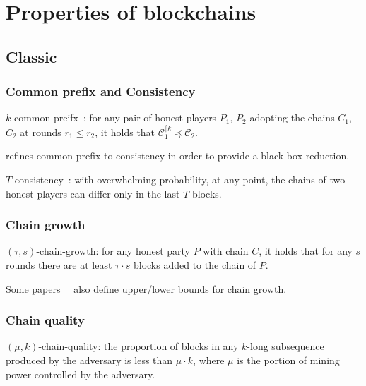 \documentclass[runningheads]{llncs}
\begin{document}
\section{Properties of blockchains}

\subsection{Classic}

\subsubsection{Common prefix and Consistency}
$k$-common-preifx~\cite{garay2015bitcoin}: for any pair of honest players $P_1$, $P_2$ adopting the chains $C_1$, $C_2$ at rounds $r_1 \leq r_2$, it holds that $\mathcal{C}_{1}^{\lceil k} \preceq \mathcal{C}_2$.

\cite{pass2017analysis} refines common prefix to consistency in order to provide a black-box reduction.

$T$-consistency~\cite{pass2017analysis}: with overwhelming probability, at any point, the chains of two honest players can differ only in the last $T$ blocks.

\subsubsection{Chain growth}
$(\tau, s)$-chain-growth: for any honest party $P$ with chain $C$, it holds that for any $s$ rounds there are at least $\tau \cdot s$ blocks added to the chain of $P$.

Some papers~\cite{rocket2018snowflake}~\cite{pass2017sleepy} also define upper/lower bounds for chain growth.

\subsubsection{Chain quality}
$(\mu, k)$-chain-quality: the proportion of blocks in any $k$-long subsequence produced by the adversary is less than $\mu \cdot k$, where $\mu$ is the portion of mining power controlled by the adversary.






\end{document}
